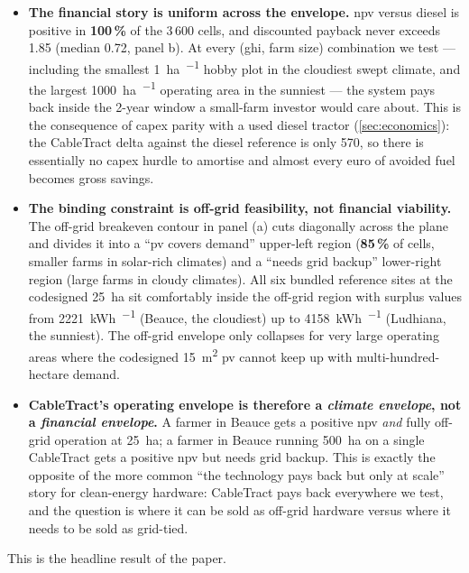 \documentclass[11pt,a4paper]{article}
\begin{document}
\begin{itemize}[leftmargin=1.6em,itemsep=0.15em]
    \item \textbf{The financial story is uniform across the envelope.} \gls{npv} versus diesel is positive in \textbf{100\,\%} of the 3\,600 cells, and discounted payback never exceeds \SI{1.85}{\year} (median \SI{0.72}{\year}, panel b). At every (\gls{ghi}, farm size) combination we test --- including the smallest \SI{1}{\hectare\per\year} hobby plot in the cloudiest swept climate, and the largest \SI{1000}{\hectare\per\year} operating area in the sunniest --- the system pays back inside the 2-year window a small-farm investor would care about. This is the consequence of capex parity with a used diesel tractor (\cref{sec:economics}): the CableTract delta against the diesel reference is only \SI{570}{\EUR}, so there is essentially no capex hurdle to amortise and almost every euro of avoided fuel becomes gross savings.
    \item \textbf{The binding constraint is off-grid feasibility, not financial viability.} The off-grid breakeven contour in panel (a) cuts diagonally across the plane and divides it into a ``\gls{pv} covers demand'' upper-left region (\textbf{85\,\%} of cells, smaller farms in solar-rich climates) and a ``needs grid backup'' lower-right region (large farms in cloudy climates). All six bundled reference sites at the codesigned \SI{25}{\hectare} sit comfortably inside the off-grid region with surplus values from \SI{2221}{\kWh\per\year} (Beauce, the cloudiest) up to \SI{4158}{\kWh\per\year} (Ludhiana, the sunniest). The off-grid envelope only collapses for very large operating areas where the codesigned \SI{15}{\meter\squared} \gls{pv} cannot keep up with multi-hundred-hectare demand.
    \item \textbf{CableTract's operating envelope is therefore a \emph{climate envelope}, not a \emph{financial envelope}.} A farmer in Beauce gets a positive \gls{npv} \emph{and} fully off-grid operation at \SI{25}{\hectare}; a farmer in Beauce running \SI{500}{\hectare} on a single CableTract gets a positive \gls{npv} but needs grid backup. This is exactly the opposite of the more common ``the technology pays back but only at scale'' story for clean-energy hardware: CableTract pays back everywhere we test, and the question is where it can be sold as off-grid hardware versus where it needs to be sold as grid-tied.
\end{itemize}

This is the headline result of the paper.
\end{document}
